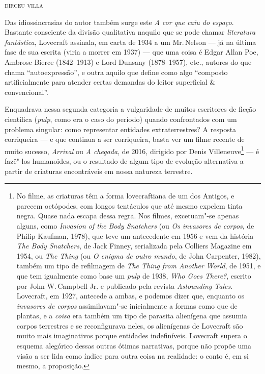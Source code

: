 \baselineskip


\begin{flushright}
\textsc{dirceu villa}
\end{flushright}

\noindent{}Das idiossincrasias do autor também surge este \textit{A cor que caiu do espaço}. Bastante consciente da divisão qualitativa naquilo que se pode chamar \textit{literatura fantástica}, Lovecraft assinala, em carta de 1934 a um Mr.\,Nelson --- já na última fase de sua escrita (viria a morrer em 1937) --- que uma coisa é Edgar Allan Poe, Ambrose Bierce (1842--1913) e Lord Dunsany (1878--1957), etc., autores do que chama ``autoexpressão'', e outra aquilo que define como algo ``composto artificialmente para atender certas demandas do leitor superficial \& convencional''.

Enquadrava nessa segunda categoria a vulgaridade de muitos escritores de ficção
científica (\textit{pulp}, como era o caso do período) quando confrontados
com um problema singular: como representar entidades extraterrestres? A
resposta corriqueira --- e que continua a ser corriqueira, basta ver um
filme recente de muito sucesso, \textit{Arrival} ou \textit{A chegada}, de 2016,
dirigido por Denis Villeneuve\footnote{No filme, as criaturas têm a forma lovecraftiana de um dos Antigos, e parecem octópodes, com longos tentáculos que até mesmo expelem tinta negra. Quase nada escapa dessa regra. Nos filmes, excetuam"-se apenas alguns, como \textit{Invasion of the Body Snatchers} (ou \textit{Os invasores de corpos}, de Philip Kaufman, 1978), que teve um antecedente em 1956 e vem da história \textit{The Body Snatchers}, de Jack Finney, serializada pela Colliers Magazine em 1954, ou \textit{The Thing} (ou \textit{O enigma de outro mundo}, de John Carpenter, 1982), também um tipo de refilmagem de \textit{The Thing from Another World}, de 1951, e que tem igualmente como base um \textit{pulp} de 1938, \textit{Who Goes There?}, escrito por John W.\,Campbell Jr. e publicado pela revista \textit{Astounding Tales}. Lovecraft, em 1927, antecede a ambas, e podemos dizer que, enquanto os \textit{invasores de corpos} assimilavam"-se inicialmente a formas como que de plantas, e a \textit{coisa} era também um tipo de parasita alienígena que assumia corpos terrestres e se reconfigurava neles, os alienígenas de Lovecraft são muito mais imaginativos porque entidades indefiníveis. Lovecraft supera o esquema alegórico dessas outras ótimas narrativas, porque não propõe uma visão a ser lida como índice para outra coisa na realidade: o conto é, em si mesmo, a proposição.} --- é fazê"-los
humanoides, ou o resultado de algum tipo de evolução alternativa a
partir de criaturas encontráveis em nossa natureza terrestre.

